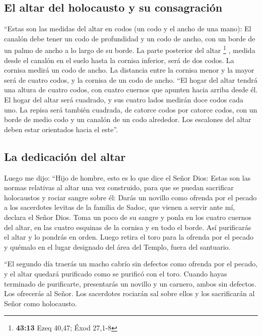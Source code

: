 \hypertarget{el-altar-del-holocausto-y-su-consagraciuxf3n}{%
\subsection{El altar del holocausto y su
consagración}\label{el-altar-del-holocausto-y-su-consagraciuxf3n}}

 ``Estas son las medidas del altar en codos (un codo y el
ancho de una mano): El canalón debe tener un codo de profundidad y un
codo de ancho, con un borde de un palmo de ancho a lo largo de su borde.
La parte posterior del altar \footnote{\textbf{43:13} Ezeq 40,47; Éxod
  27,1-8}  , medida desde el canalón en el suelo hasta la
cornisa inferior, será de dos codos. La cornisa medirá un codo de ancho.
La distancia entre la cornisa menor y la mayor será de cuatro codos, y
la cornisa de un codo de ancho.  ``El hogar del altar
tendrá una altura de cuatro codos, con cuatro cuernos que apunten hacia
arriba desde él.  El hogar del altar será cuadrado, y sus
cuatro lados medirán doce codos cada uno.  La repisa será
también cuadrada, de catorce codos por catorce codos, con un borde de
medio codo y un canalón de un codo alrededor. Los escalones del altar
deben estar orientados hacia el este''.

\hypertarget{la-dedicaciuxf3n-del-altar}{%
\subsection{La dedicación del altar}\label{la-dedicaciuxf3n-del-altar}}

 Luego me dijo: ``Hijo de hombre, esto es lo que dice el
Señor Dios: Estas son las normas relativas al altar una vez construido,
para que se puedan sacrificar holocaustos y rociar sangre sobre él:
 Darás un novillo como ofrenda por el pecado a los
sacerdotes levitas de la familia de Sadoc, que vienen a servir ante mí,
declara el Señor Dios.  Toma un poco de su sangre y ponla
en los cuatro cuernos del altar, en las cuatro esquinas de la cornisa y
en todo el borde. Así purificarás el altar y lo pondrás en orden.
 Luego retira el toro para la ofrenda por el pecado y
quémalo en el lugar designado del área del Templo, fuera del santuario.

 ``El segundo día traerás un macho cabrío sin defectos
como ofrenda por el pecado, y el altar quedará purificado como se
purificó con el toro.  Cuando hayas terminado de
purificarte, presentarás un novillo y un carnero, ambos sin defectos.
 Los ofrecerás al Señor. Los sacerdotes rociarán sal
sobre ellos y los sacrificarán al Señor como holocausto.

